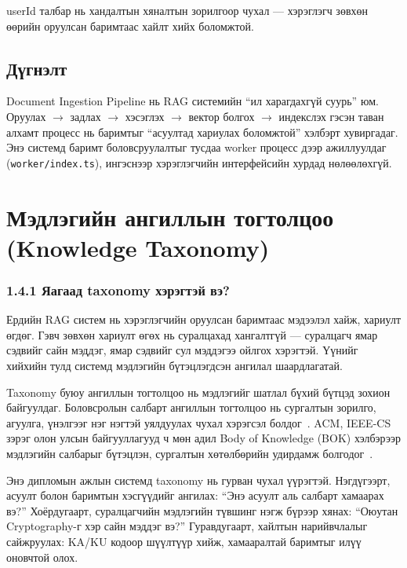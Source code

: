 \documentclass[12pt,A4]{report}
\newcommand{\eng}[1]{#1}
\begin{document}
userId талбар нь хандалтын хяналтын зорилгоор чухал --- хэрэглэгч зөвхөн өөрийн оруулсан баримтаас хайлт хийх боломжтой.

\subsection{Дүгнэлт}

Document Ingestion Pipeline нь RAG системийн ``ил харагдахгүй суурь'' юм. Оруулах $\rightarrow$ задлах $\rightarrow$ хэсэглэх $\rightarrow$ вектор болгох $\rightarrow$ индекслэх гэсэн таван алхамт процесс нь баримтыг ``асуултад хариулах боломжтой'' хэлбэрт хувиргадаг. Энэ системд баримт боловсруулалтыг тусдаа worker процесс дээр ажиллуулдаг (\texttt{worker/index.ts}), ингэснээр хэрэглэгчийн интерфейсийн хурдад нөлөөлөхгүй.

\section{Мэдлэгийн ангиллын тогтолцоо (Knowledge Taxonomy)}

\subsubsection{1.4.1 Яагаад \eng{taxonomy} хэрэгтэй вэ?}

Ердийн RAG систем нь хэрэглэгчийн оруулсан баримтаас мэдээлэл хайж, хариулт өгдөг. Гэвч зөвхөн хариулт өгөх нь суралцахад хангалтгүй --- суралцагч ямар сэдвийг сайн мэддэг, ямар сэдвийг сул мэддэгээ ойлгох хэрэгтэй. Үүнийг хийхийн тулд системд мэдлэгийн бүтэцлэгдсэн ангилал шаардлагатай.

\eng{Taxonomy} буюу ангиллын тогтолцоо нь мэдлэгийг шатлал бүхий бүтцэд зохион байгуулдаг. Боловсролын салбарт ангиллын тогтолцоо нь сургалтын зорилго, агуулга, үнэлгээг нэг нэгтэй уялдуулах чухал хэрэгсэл болдог~\cite{bloom1956}. ACM, IEEE-CS зэрэг олон улсын байгууллагууд ч мөн адил \eng{Body of Knowledge} (BOK) хэлбэрээр мэдлэгийн салбарыг бүтэцлэн, сургалтын хөтөлбөрийн удирдамж болгодог~\cite{cs2023}.

Энэ дипломын ажлын системд \eng{taxonomy} нь гурван чухал үүрэгтэй. Нэгдүгээрт, асуулт болон баримтын хэсгүүдийг ангилах: ``Энэ асуулт аль салбарт хамаарах вэ?'' Хоёрдугаарт, суралцагчийн мэдлэгийн түвшинг нэгж бүрээр хянах: ``Оюутан \eng{Cryptography}-г хэр сайн мэддэг вэ?'' Гуравдугаарт, хайлтын нарийвчлалыг сайжруулах: KA/KU кодоор шүүлтүүр хийж, хамааралтай баримтыг илүү оновчтой олох.
\end{document}
